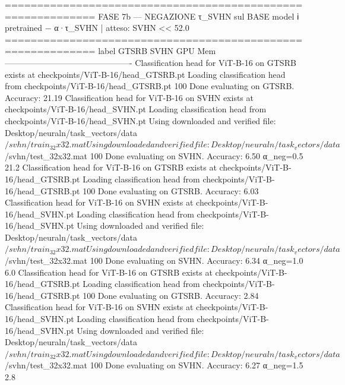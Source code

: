 ============================================================
  FASE 7b — NEGAZIONE τ_SVHN sul BASE model
  ℹ pretrained − α·τ_SVHN | atteso: SVHN << 52.0%
============================================================
  label               GTSRB     SVHN    GPU Mem
  ----------------------------------------------
Classification head for ViT-B-16 on GTSRB exists at checkpoints/ViT-B-16/head_GTSRB.pt
Loading classification head from checkpoints/ViT-B-16/head_GTSRB.pt
100%
Done evaluating on GTSRB. Accuracy: 21.19%
Classification head for ViT-B-16 on SVHN exists at checkpoints/ViT-B-16/head_SVHN.pt
Loading classification head from checkpoints/ViT-B-16/head_SVHN.pt
Using downloaded and verified file: Desktop/neuraln/task_vectors/data$/svhn/train_32x32.mat
Using downloaded and verified file: Desktop/neuraln/task_vectors/data$/svhn/test_32x32.mat
100%
Done evaluating on SVHN. Accuracy: 6.50%
  α_neg=0.5           21.2%
Classification head for ViT-B-16 on GTSRB exists at checkpoints/ViT-B-16/head_GTSRB.pt
Loading classification head from checkpoints/ViT-B-16/head_GTSRB.pt
100%
Done evaluating on GTSRB. Accuracy: 6.03%
Classification head for ViT-B-16 on SVHN exists at checkpoints/ViT-B-16/head_SVHN.pt
Loading classification head from checkpoints/ViT-B-16/head_SVHN.pt
Using downloaded and verified file: Desktop/neuraln/task_vectors/data$/svhn/train_32x32.mat
Using downloaded and verified file: Desktop/neuraln/task_vectors/data$/svhn/test_32x32.mat
100%
Done evaluating on SVHN. Accuracy: 6.34%
  α_neg=1.0            6.0%
Classification head for ViT-B-16 on GTSRB exists at checkpoints/ViT-B-16/head_GTSRB.pt
Loading classification head from checkpoints/ViT-B-16/head_GTSRB.pt
100%
Done evaluating on GTSRB. Accuracy: 2.84%
Classification head for ViT-B-16 on SVHN exists at checkpoints/ViT-B-16/head_SVHN.pt
Loading classification head from checkpoints/ViT-B-16/head_SVHN.pt
Using downloaded and verified file: Desktop/neuraln/task_vectors/data$/svhn/train_32x32.mat
Using downloaded and verified file: Desktop/neuraln/task_vectors/data$/svhn/test_32x32.mat
100%
Done evaluating on SVHN. Accuracy: 6.27%
  α_neg=1.5            2.8%

